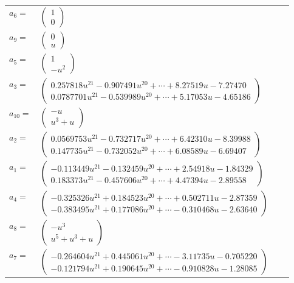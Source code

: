 \documentclass[1p]{elsarticle_modified}
\theoremstyle{definition}
\begin{document}
\begin{tabular}{m{7pt} m{180pt} m{7pt} m{180pt} }
\flushright $a_{6}=$&$\begin{pmatrix}1\\0\end{pmatrix}$ \\
\flushright $a_{9}=$&$\begin{pmatrix}0\\u\end{pmatrix}$ \\
\flushright $a_{5}=$&$\begin{pmatrix}1\\- u^2\end{pmatrix}$ \\
\flushright $a_{3}=$&$\begin{pmatrix}0.257818 u^{21}-0.907491 u^{20}+\cdots+8.27519 u-7.27470\\0.0787701 u^{21}-0.539989 u^{20}+\cdots+5.17053 u-4.65186\end{pmatrix}$ \\
\flushright $a_{10}=$&$\begin{pmatrix}- u\\u^3+u\end{pmatrix}$ \\
\flushright $a_{2}=$&$\begin{pmatrix}0.0569753 u^{21}-0.732717 u^{20}+\cdots+6.42310 u-8.39988\\0.147735 u^{21}-0.732052 u^{20}+\cdots+6.08589 u-6.69407\end{pmatrix}$ \\
\flushright $a_{1}=$&$\begin{pmatrix}-0.113449 u^{21}-0.132459 u^{20}+\cdots+2.54918 u-1.84329\\0.183373 u^{21}-0.457606 u^{20}+\cdots+4.47394 u-2.89558\end{pmatrix}$ \\
\flushright $a_{4}=$&$\begin{pmatrix}-0.325326 u^{21}+0.184523 u^{20}+\cdots+0.502711 u-2.87359\\-0.383495 u^{21}+0.177086 u^{20}+\cdots-0.310468 u-2.63640\end{pmatrix}$ \\
\flushright $a_{8}=$&$\begin{pmatrix}- u^3\\u^5+u^3+u\end{pmatrix}$ \\
\flushright $a_{7}=$&$\begin{pmatrix}-0.264604 u^{21}+0.445061 u^{20}+\cdots-3.11735 u-0.705220\\-0.121794 u^{21}+0.190645 u^{20}+\cdots-0.910828 u-1.28085\end{pmatrix}$ \\

\end{tabular}
\end{document}

